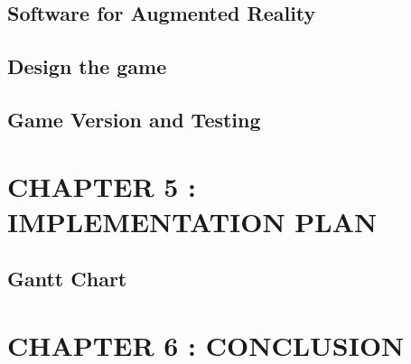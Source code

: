 \documentclass[12pt]{article}
\begin{document}
\subsection{Software for Augmented Reality}
\subsection{Design the game}
\subsection{Game Version and Testing}

\pagebreak

\section{CHAPTER 5 : IMPLEMENTATION PLAN}
\subsection{Gantt Chart}
\pagebreak

\section{CHAPTER 6 : CONCLUSION}
\pagebreak



\end{document}
